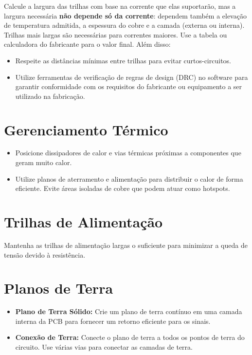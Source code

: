 Calcule a largura das trilhas com base na corrente que elas suportarão, mas a largura necessária \textbf{não depende só da corrente}: dependem também a elevação de temperatura admitida, a espessura do cobre e a camada (externa ou interna). Trilhas mais largas são necessárias para correntes maiores. Use a tabela ou calculadora do fabricante para o valor final. Além disso:

\begin{itemize}
\item
  Respeite as distâncias mínimas entre trilhas para evitar curtos-circuitos.
\item
  Utilize ferramentas de verificação de regras de design (DRC) no software para garantir conformidade com os requisitos do fabricante ou equipamento a ser utilizado na fabricação.
\end{itemize}

\hypertarget{gerenciamento-tuxe9rmico}{%
\section{Gerenciamento Térmico}\label{gerenciamento-tuxe9rmico}}

\begin{itemize}
\tightlist
\item
  Posicione dissipadores de calor e vias térmicas próximas a componentes que geram muito calor.
\item
  Utilize planos de aterramento e alimentação para distribuir o calor de forma eficiente. Evite áreas isoladas de cobre que podem atuar como hotspots.
\end{itemize}

\hypertarget{trilhas-de-alimentauxe7uxe3o}{%
\section{Trilhas de Alimentação}\label{trilhas-de-alimentauxe7uxe3o}}

Mantenha as trilhas de alimentação largas o suficiente para minimizar a queda de tensão devido à resistência.

\hypertarget{planos-de-terra}{%
\section{Planos de Terra}\label{planos-de-terra}}

\begin{itemize}
\tightlist
\item
  \textbf{Plano de Terra Sólido:} Crie um plano de terra contínuo em uma camada interna da PCB para fornecer um retorno eficiente para os sinais.
\item
  \textbf{Conexão de Terra:} Conecte o plano de terra a todos os pontos de terra do circuito. Use várias vias para conectar as camadas de terra.
\end{itemize}

